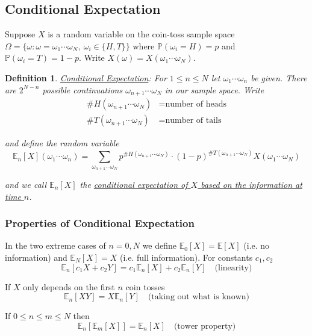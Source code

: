 \documentclass[12pt]{article}
\newtheorem{definition}{Definition}
\newlength\tindent
\renewcommand{\indent}{\hspace*{\tindent}}
\renewcommand{\P}{\mathbb P}
\newcommand{\E}{\mathbb E}
\begin{document}
\subsection{Conditional Expectation}

\indent Suppose $X$ is a random variable on the coin-toss sample space $\Omega = \{ \omega: \omega = \omega_1\cdots\omega_N,~\omega_i \in \{H, T\}\}$ where $\P(\omega_i = H) = p$ and $\P(\omega_i = T) = 1 - p$. Write $X(\omega) = X(\omega_1\cdots\omega_N)$.

\begin{definition} \underline{Conditional Expectation}: For $1 \leq n \leq N$ let $\omega_1\cdots\omega_n$ be given. There are $2^{N - n}$ possible continuations $\omega_{n + 1}\cdots\omega_N$ in our sample space. Write
\begin{align*}
	\#H(\omega_{n + 1}\cdots\omega_N) &= \text{number of heads} \\
	\#T(\omega_{n + 1}\cdots\omega_N) &= \text{number of tails}
\end{align*}

and define the random variable
\begin{equation*}
	\E_n[X](\omega_1\cdots\omega_n) = \sum_{\omega_{n + 1}\cdots \omega_N} p^{\#H(\omega_{n + 1}\cdots\omega_N)}\cdot(1 - p)^{\#T(\omega_{n + 1}\cdots\omega_N)}X({\omega_1\cdots\omega_N})
\end{equation*}

and we call $\E_n[X]$ the \underline{conditional expectation of $X$ based on the information at time $n$}.
\end{definition}

\subsubsection{Properties of Conditional Expectation}

\indent In the two extreme cases of $n = 0, N$ we define $\E_0[X] = \E[X]$ (i.e. no information) and $\E_N[X] = X$ (i.e. full information). For constants $c_1, c_2$
\begin{equation*}
	\E_n[c_1X + c_2Y] = c_1\E_n[X] + c_2\E_n[Y] \quad \text{(linearity)}
\end{equation*}

If $X$ only depends on the first $n$ coin tosses 
\begin{equation*}
	\E_n[XY] = X\E_n[Y] \quad \text{(taking out what is known)}
\end{equation*}

If $0 \leq n \leq m \leq N$ then
\begin{equation*}
	\E_n[\E_m[X]] = \E_n[X] \quad \text{(tower property)}
\end{equation*}
\end{document}
